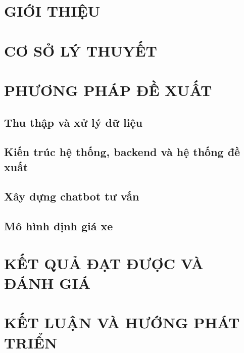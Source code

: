 \endgroup

\clearpage
\chapter{GIỚI THIỆU}
\setcounter{page}{1}


\chapter{CƠ SỞ LÝ THUYẾT}


\chapter{PHƯƠNG PHÁP ĐỀ XUẤT}
\section{Thu thập và xử lý dữ liệu}

\section{Kiến trúc hệ thống, backend và hệ thống đề xuất}

\section{Xây dựng chatbot tư vấn}

\section{Mô hình định giá xe}


\chapter{KẾT QUẢ ĐẠT ĐƯỢC VÀ ĐÁNH GIÁ}


\chapter{KẾT LUẬN VÀ HƯỚNG PHÁT TRIỂN}


